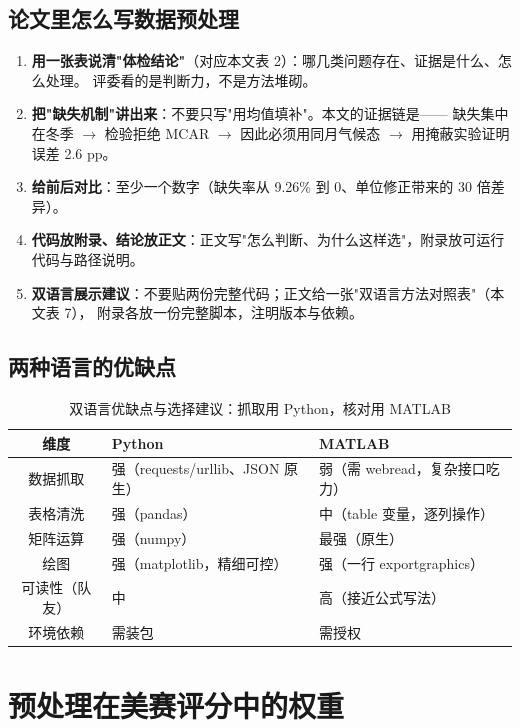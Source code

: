 \documentclass[11pt,a4paper]{ctexart}
\begin{document}
\subsection{论文里怎么写数据预处理}

\begin{enumerate}
\item \textbf{用一张表说清"体检结论"}（对应本文表 2）：哪几类问题存在、证据是什么、怎么处理。
评委看的是判断力，不是方法堆砌。
\item \textbf{把"缺失机制"讲出来}：不要只写"用均值填补"。本文的证据链是——
缺失集中在冬季 $\to$ 检验拒绝 MCAR $\to$ 因此必须用同月气候态 $\to$ 用掩蔽实验证明误差 2.6 pp。
\item \textbf{给前后对比}：至少一个数字（缺失率从 9.26\% 到 0、单位修正带来的 30 倍差异）。
\item \textbf{代码放附录、结论放正文}：正文写"怎么判断、为什么这样选"，附录放可运行代码与路径说明。
\item \textbf{双语言展示建议}：不要贴两份完整代码；正文给一张"双语言方法对照表"（本文表 7），
附录各放一份完整脚本，注明版本与依赖。
\end{enumerate}

\subsection{两种语言的优缺点}

\begin{table}[H]\centering\small
\begin{tabularx}{\textwidth}{|c|X|X|}
\toprule
维度 & Python & MATLAB \\
\midrule
数据抓取 & 强（requests/urllib、JSON 原生） & 弱（需 webread，复杂接口吃力） \\
表格清洗 & 强（pandas） & 中（table 变量，逐列操作） \\
矩阵运算 & 强（numpy） & 最强（原生） \\
绘图 & 强（matplotlib，精细可控） & 强（一行 exportgraphics） \\
可读性（队友） & 中 & 高（接近公式写法） \\
环境依赖 & 需装包 & 需授权 \\
\bottomrule
\end{tabularx}
\caption{双语言优缺点与选择建议：抓取用 Python，核对用 MATLAB}
\end{table}

\section{预处理在美赛评分中的权重}
\end{document}
